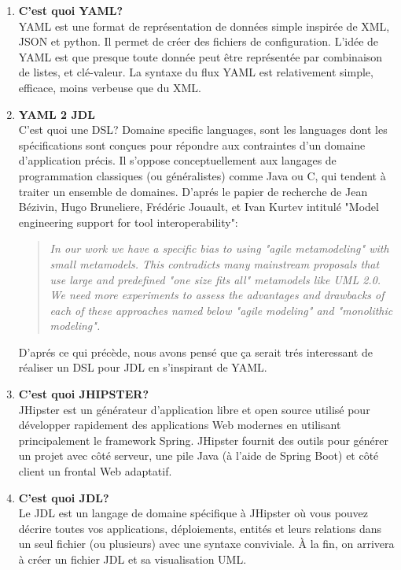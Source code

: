 \begin{enumerate}
    \def\labelenumi{\arabic{enumi}.}
    \item
      \textbf{C'est quoi YAML?}\\
      YAML est une format de représentation de données simple inspirée de XML,
      JSON et python. Il permet de créer des fichiers de configuration. L'idée
      de YAML est que presque toute donnée peut être représentée par
      combinaison de listes, et clé-valeur. La syntaxe du flux YAML est
      relativement simple, efficace, moins verbeuse que du XML.

    \item
      \textbf{YAML 2 JDL}\\    
      C'est quoi une DSL? Domaine specific languages, sont les languages dont
      les spécifications sont conçues pour répondre aux contraintes d'un
      domaine d'application précis. Il s'oppose conceptuellement aux langages
      de programmation classiques (ou généralistes) comme Java ou C, qui
      tendent à traiter un ensemble de domaines.
      D'aprés le papier de recherche de Jean Bézivin, Hugo Bruneliere,
      Frédéric Jouault, et Ivan Kurtev intitulé "Model engineering support for
      tool interoperability":
      \begin{quote}
        \textit{
            In our work we have a specific bias to using "agile metamodeling" with
            small metamodels. This contradicts many mainstream proposals that use
            large and predefined "one size fits all" metamodels like UML 2.0. We
            need more experiments to assess the advantages and drawbacks of each of
            these approaches named below "agile modeling" and "monolithic modeling".
        }
    \end{quote}
      D'aprés ce qui précède, nous avons pensé que ça serait trés interessant
      de réaliser un DSL pour JDL en s'inspirant de YAML.

    \item
      \textbf{C'est quoi JHIPSTER?}\\
      JHipster est un générateur d'application libre et open source utilisé pour développer rapidement des applications Web modernes en utilisant principalement le framework Spring. JHipster fournit des outils pour générer un projet avec côté serveur, une pile Java (à l'aide de Spring Boot) et côté client un frontal Web adaptatif.

    \item
      \textbf{C'est quoi JDL?}\\
      Le JDL est un langage de domaine spécifique à JHipster où vous pouvez
      décrire toutes vos applications, déploiements, entités et leurs
      relations dans un seul fichier (ou plusieurs) avec une syntaxe
      conviviale. À la fin, on arrivera à créer un fichier JDL et sa
      visualisation UML.

\end{enumerate}

